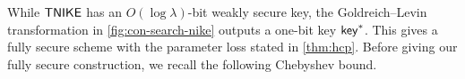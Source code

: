 
 While $\mathsf{TNIKE}$ has an $O(\log\lambda)$-bit weakly secure key, the Goldreich--Levin transformation in \cref{fig:con-search-nike} outputs a one-bit key $\mathsf{key}^*$. This gives a fully secure scheme with the parameter loss stated in \cref{thm:hcp}.
Before giving our fully secure construction, we recall the following Chebyshev bound.



